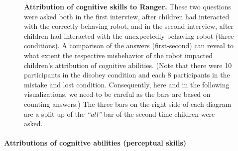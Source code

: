 \documentclass{sig-alternate}
\begin{document}
\begin{figure}[!h]
    \centering
    \caption[Attribution of Cognitive Skills to Ranger]{\small
    \textbf{Attribution of cognitive skills to Ranger.} These two questions were
    asked both in the first interview, after children had interacted with the
    correctly behaving robot, and in the second interview, after children had
    interacted with the unexpectedly behaving robot (three conditions). A comparison
    of the answers (first-second) can reveal to what extent the respective
    misbehavior of the robot impacted children's attribution of cognitive abilities.
    (Note that there were 10 participants in the disobey condition and each 8
    participants in the mistake and lost condition. Consequently, here and in the
    following visualizations, we need to be careful as the bars are based on
    counting answers.) The three bars on the right side of each diagram are a
    split-up of the \textit{``all''} bar of the second time children were asked.}
        
    \label{fig:domino-cognition}
\end{figure}	 
 
\paragraph{Attributions of cognitive abilities (perceptual skills)}
\end{document}
